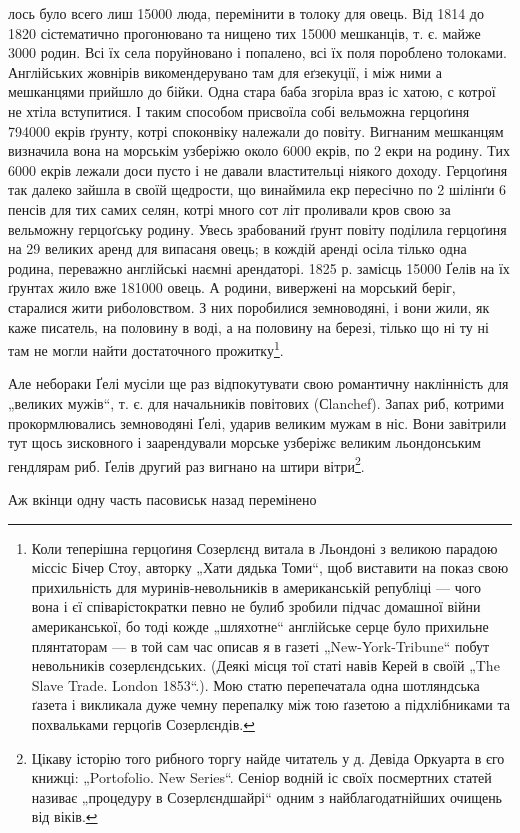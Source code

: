лось було всего лиш 15000 люда, перемінити в толоку для овець. Від 1814 до 1820 сістематично
прогонювано та нищено тих 15000 мешканців, т. є. майже 3000 родин. Всі їх села поруйновано і
попалено, всі їх поля пороблено толоками. Англійських жовнірів викомендерувано там для еґзекуції, і
між ними а мешканцями прийшло до бійки. Одна
стара баба згоріла враз іс хатою, с котрої не хтіла вступитися. І таким способом присвоїла собі
вельможна герцоґиня 794000 екрів ґрунту, котрі споконвіку належали до
повіту. Вигнаним мешканцям визначила вона на морськім узберіжю около 6000 екрів, по 2 екри на
родину. Тих 6000 екрів лежали доси пусто і не давали властительці ніякого
доходу. Герцоґиня так далеко зайшла в своїй щедрости, що винаймила екр пересічно по 2 шілінґи 6
пенсів для тих самих селян, котрі много сот літ проливали кров свою за
вельможну герцоґську родину. Увесь зрабований ґрунт повіту поділила герцоґиня на 29 великих аренд
для випасаня овець; в кождій аренді осіла тілько одна родина, переважно англійські наємні
арендаторі. 1825 р. замісць 15000 Ґелів на їх ґрунтах жило вже 181000 овець. А родини, вивержені на
морський беріг, старалися жити риболовством. З них поробилися земноводяні, і вони жили, як каже
писатель, на половину в воді, а на половину на березі, тілько що ні ту ні там не могли найти
достаточного прожитку\footnote{
Коли теперішна герцоґиня Созерлєнд витала в Льондоні з великою парадою міссіс Бічер Стоу,
авторку „Хати дядька Томи“, щоб виставити на показ свою прихильність для муринів-невольників в
американській републіці — чого вона і єї співарістократки певно не булиб зробили підчас домашної
війни американської, бо тоді кожде „шляхотне“ англійське серце було прихильне плянтаторам — в той
сам час описав
я в газеті „New-York-Tribune“ побут невольників созерлєндських. (Деякі місця тої статі навів Керей в
своїй „The Slave Trade. London 1853“.). Мою статю перепечатала одна шотляндська ґазета і викликала
дуже чемну перепалку між тою ґазетою а підхлібниками та похвальками герцоґів Созерлєндів.
}.

Але небораки Ґелі мусіли ще раз відпокутувати свою романтичну наклінність для „великих мужів“, т. є.
для начальників повітових (Сlanchef). Запах риб, котрими прокормлювались земноводяні Ґелі, ударив
великим мужам в ніс. Вони завітрили тут щось зисковного і заарендували морське узберіжє великим
льондонським гендлярам риб. Ґелів другий раз вигнано на штири вітри\footnote{
Цікаву історію того рибного торгу найде читатель у д. Девіда Оркуарта в єго книжці: „Portofolio.
New Series“. Сеніор водній іс своїх посмертних статей називає „процедуру в Созерлєндшайрі“ одним з
найблагодатнійших очищень від віків.
}.

Аж вкінци одну часть пасовиськ назад перемінено